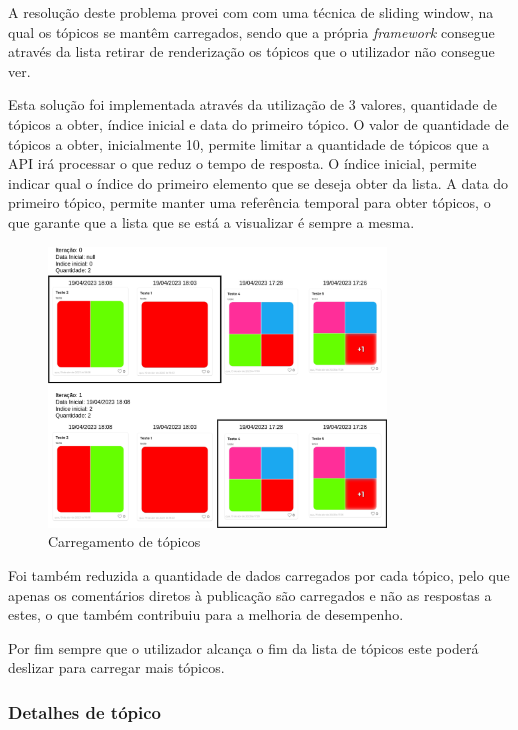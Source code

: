A resolução deste problema provei com com uma técnica de sliding window, na qual os tópicos se mantêm carregados, sendo que a própria \textit{framework} consegue através da lista retirar de renderização os tópicos que o utilizador não consegue ver. 

Esta solução foi implementada através da utilização de 3 valores, quantidade de tópicos a obter, índice inicial e data do primeiro tópico. O valor de quantidade de tópicos a obter, inicialmente 10, permite limitar a quantidade de tópicos que a API irá processar o que reduz o tempo de resposta. O índice inicial, permite indicar qual o índice do primeiro elemento que se deseja obter da lista. A data do primeiro tópico, permite manter uma referência temporal para obter tópicos, o que garante que a lista que se está a visualizar é sempre a mesma.

\begin{figure}[htb]
  \centering
  \includegraphics[width=0.8\textwidth]{images/implementacao/frontend/forum/loading_topics/topics_loading.png}
  \caption{Carregamento de tópicos}
  \label{fig:74}
\end{figure}

Foi também reduzida a quantidade de dados carregados por cada tópico, pelo que apenas os comentários diretos à publicação são carregados e não as respostas a estes, o que também contribuiu para a melhoria de desempenho.

Por fim sempre que o utilizador alcança o fim da lista de tópicos este poderá deslizar para carregar mais tópicos.

\newpage

\subsubsection{Detalhes de tópico}

